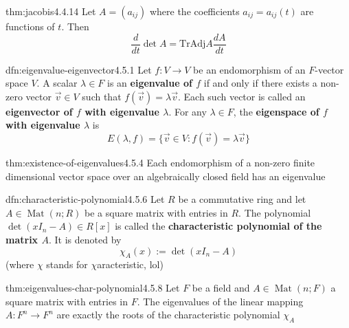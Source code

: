 \documentclass[landscape, 8pt]{extarticle}
\DeclareMathOperator{\Mat}{Mat}
\begin{document}
\begin{multicols}{3}
\begin{thm}{thm:jacobis}{4.4.14}
    Let $A = (a_{ij})$ where the coefficients $a_{ij} = a_{ij}(t)$ are functions of $t$. Then
    \[\frac{d}{dt} \det A = \text{Tr}\text{Adj} A \frac{dA}{dt}\]
\end{thm}

\begin{dfn}{dfn:eigenvalue-eigenvector}{4.5.1}
    Let $f: V \to V $ be an endomorphism of an $F$-vector space $V$. A scalar $\lambda\in F$ is an \textbf{eigenvalue of $f$} if and only if there exists a non-zero vector $\vec{v}\in V$ such that $f(\vec{v}) = \lambda \vec{v}$. Each such vector is called an \textbf{eigenvector of $f$ with eigenvalue $\lambda$}. For any $\lambda\in F$, the \textbf{eigenspace of $f$ with eigenvalue $\lambda$} is
    \[E(\lambda, f) = \{\vec{v}\in V : f(\vec{v}) = \lambda \vec{v}\}\]
\end{dfn}

\begin{thm}{thm:existence-of-eigenvalues}{4.5.4}
    Each endomorphism of a non-zero finite dimensional vector space over an algebraically closed field has an eigenvalue
\end{thm}

\begin{dfn}{dfn:characteristic-polynomial}{4.5.6}
    Let $R$ be a commutative ring and let $A\in \Mat(n;R)$ be a square matrix with entries in $R$. The polynomial $\det(x I_{n} - A)\in R[x]$ is called the \textbf{characteristic polynomial of the matrix $A$}. It is denoted by
    \[\chi_{A}(x) := \det(x I_{n} - A)\]
    (where $\chi$ stands for $\chi$aracteristic, lol)
\end{dfn}

\begin{thm}{thm:eigenvalues-char-polynomial}{4.5.8}
    Let $F$ be a field and $A\in \Mat(n;F)$ a square matrix with entries in $F$. The eigenvalues of the linear mapping $A : F^{n}\to F^{n}$ are exactly the roots of the characteristic polynomial $\chi_{A}$
\end{thm}


\end{multicols}
\end{document}
